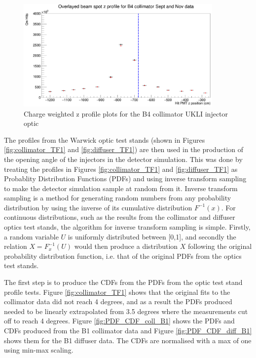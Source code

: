 \begin{figure}
    \centering
    \includegraphics[width=0.9\textwidth]{Figures/charge_weighted_nov_sept_B4.PNG}
    \caption{Charge weighted z profile plots for the B4 collimator UKLI injector optic}
    \label{fig:charge_weighted_nov_sept_B4}
\end{figure}


The profiles from the Warwick optic test stands (shown in Figures \ref{fig:collimator_TF1} and \ref{fig:diffuser_TF1}) are then used in the production of the opening angle of the injectors in the detector simulation. This was done by treating the profiles in Figures \ref{fig:collimator_TF1} and \ref{fig:diffuser_TF1} as Probablity Distribution Functions (PDFs) and using inverse transform sampling to make the detector simulation sample at random from it. Inverse transform sampling is a method for generating random numbers from any probability distribution by using the inverse of its cumulative distribution $F^{-1}(x)$. For continuous distributions, such as the results from the collimator and diffuser optics test stands, the algorithm for inverse transform sampling is simple. Firstly, a random variable $U$ is uniformly distributed between [0,1], and secondly the relation $X = F^{-1}_{x}(U)$ would then produce a distribution $X$ following the original probability distribution function, i.e. that of the original PDFs from the optics test stands. 

The first step is to produce the CDFs from the PDFs from the optic test stand profile tests. Figure \ref{fig:collimator_TF1} shows that the original fits to the collimator data did not reach 4 degrees, and as a result the PDFs produced needed to be linearly extrapolated from 3.5 degrees where the measurements cut off to reach 4 degrees. Figure \ref{fig:PDF_CDF_coll_B1} shows the PDFs and CDFs produced from the B1 collimator data and Figure \ref{fig:PDF_CDF_diff_B1} shows them for the B1 diffuser data. The CDFs are normalised with a max of one using min-max scaling.


